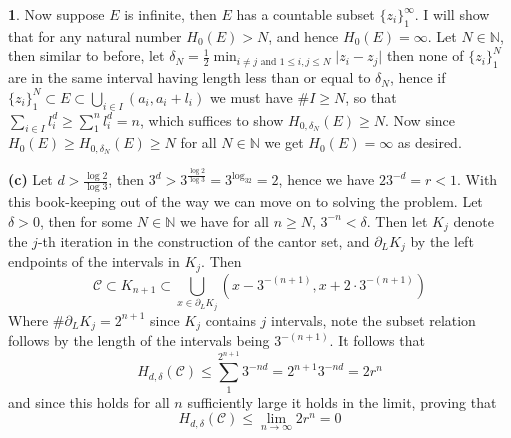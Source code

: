 \documentclass[10.5pt]{article}
\theoremstyle{definition}
\newtheorem{pb}{}
\newcommand{\set}[1]{\{#1\}}
\newcommand{\abs}[1]{\lvert#1\rvert}
\newcommand{\tand}{\text{ and }}
\begin{document}
\begin{pb}
        Now suppose \(E\)  is infinite, then \(E\) has a countable subset \(\set{z_i}_1^\infty\). I will show that for any natural number \(H_0(E) > N\), and hence \(H_0(E) = \infty\).
        Let \(N \in \mathbb{N}\), then similar to before, let \newline \(\delta_N = \frac12 \min_{i \neq j \tand 1 \leq i,j \leq N}\abs{z_i - z_j}\)
        then none of \(\set{z_i}_1^N\) are in the same interval having length less than or equal to \(\delta_N\), hence if \(\set{z_i}_1^N \subset E \subset \bigcup_{i \in I}(a_i,a_i + l_i)\)
        we must have \(\# I \geq N\), so that \(\sum_{i \in I} l_i^d \geq \sum_1^n l_i^d = n\), which suffices to show \(H_{0,\delta_N}(E) \geq N\). 
        Now since \(H_0 (E)\geq H_{0,\delta_N}(E) \geq N\) for all \(N \in \mathbb{N}\) we get \(H_0(E) = \infty\) as desired. 

        \textbf{(c)} Let \(d > \frac{\log2}{\log3}\), then \(3^d > 3^{\frac{\log2}{\log3}} = 3^{\log_32} = 2\), hence we have \(23^{-d} = r < 1\). With this book-keeping out of the way we can
        move on to solving the problem. Let \(\delta > 0\), then for some \(N \in \mathbb{N}\) we have for all \(n \geq N\), \(3^{-n} < \delta\). Then let \(K_j\) denote the \(j\)-th iteration in the construction of the cantor set, and
        \(\partial_L K_j\) by the left endpoints of the intervals in \(K_j\). Then 
        \[\mathcal{C} \subset K_{n+1} \subset \bigcup_{x \in \partial_L K_j}(x - 3^{-(n+1)}, x + 2\cdot3^{-(n+1)})\]
        Where \(\# \partial_L K_j = 2^{n+1}\) since \(K_j\) contains \(j\) intervals, note the subset relation follows by the length of the intervals being \(3^{-(n+1)}\).
        It follows that 
        \[H_{d,\delta}(\mathcal{C}) \leq \sum_1^{2^{n+1}}3^{-nd} = 2^{n+1}3^{-nd} = 2r^n\]
        and since this holds for all \(n\) sufficiently large it holds in the limit, proving that
        \[H_{d,\delta}(\mathcal{C}) \leq \lim_{n\to\infty}2r^n = 0\]
    \end{pb}
\end{document}
